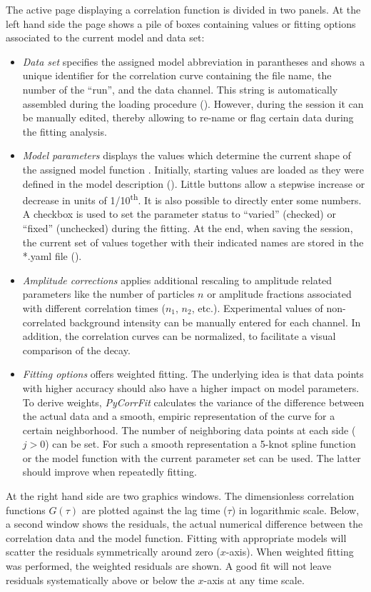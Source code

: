 The active page displaying a correlation function is divided in two panels. At the left hand side the page\textit{ }shows a pile of boxes containing values or fitting options associated to the current model and data set: 

\begin{itemize}
\item \textit{Data set} specifies the assigned model abbreviation in parantheses and shows a unique identifier for the correlation curve containing the file name, the number of the ``run'', and the data channel. This string is automatically assembled during the loading procedure (). However, during the session it can be manually edited, thereby allowing to re-name or flag certain data during the fitting analysis.
\item \textit{Model parameters} displays the values which determine the current shape of the assigned model function . Initially, starting values are loaded as they were defined in the model description (). Little buttons allow a stepwise increase or decrease in units of 1/10\textsuperscript{th}. It is also possible to directly enter some numbers. A checkbox is used to set the parameter status to ``varied'' (checked) or ``fixed'' (unchecked) during the fitting. At the end, when saving the session, the current set of values together with their indicated names are stored in the *.yaml file (). 
\item \textit{Amplitude corrections} applies additional rescaling to amplitude related parameters like the number of particles $n$ or amplitude fractions associated with different correlation times ($n_1$, $n_2$, etc.). Experimental values of non-correlated background intensity can be manually entered for each channel. In addition, the correlation curves can be normalized, to facilitate a visual comparison of the decay.
\item \textit{Fitting options} offers weighted fitting. The underlying idea is that data points with higher accuracy should also have a higher impact on model parameters. To derive weights, \textit{PyCorrFit} calculates the variance of the difference between the actual data and a smooth, empiric representation of the curve for a certain neighborhood. The number of neighboring data points at each side ($j > 0$) can be set. For such a smooth representation a 5-knot spline function or the model function with the current parameter set can be used. The latter should improve when repeatedly fitting.
\end{itemize}
At the right hand side are two graphics windows. The dimensionless correlation functions $G(\tau)$ are plotted against the lag time ($\tau$) in logarithmic scale. Below, a second window shows the residuals, the actual numerical difference between the correlation data and the model function. Fitting with appropriate models will scatter the residuals symmetrically around zero ($x$-axis). When weighted fitting was performed, the weighted residuals are shown. A good fit will not leave residuals systematically above or below the $x$-axis at any time scale.

